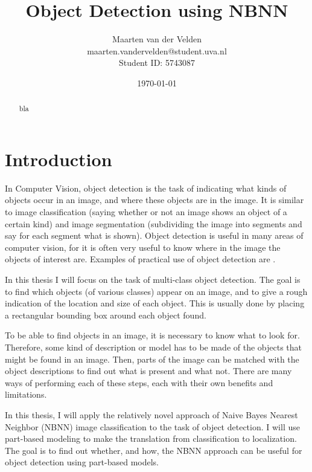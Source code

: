 \documentclass[a4paper,10pt]{article}
\title{Object Detection using NBNN}
\author{Maarten van der Velden\\maarten.vandervelden@student.uva.nl\\Student ID: 5743087}
\date{\today}
\begin{document}
\begin{titlepage}
    \vspace{10cm}
    \maketitle
    \thispagestyle{empty}
\end{titlepage}


\begin{abstract}
    bla
\end{abstract}

\section{Introduction} %
\label{sec:introduction}
In Computer Vision, object detection is the task of indicating what kinds of objects occur in an image, and where these objects are in the image. It is similar to image classification (saying whether or not an image shows an object of a certain kind) and image segmentation (subdividing the image into segments and say for each segment what is shown). Object detection is useful in many areas of computer vision, for it is often very useful to know where in the image the objects of interest are. Examples of practical use of object detection are .

In this thesis I will focus on the task of multi-class object detection. The goal is to find which objects (of various classes) appear on an image, and to give a rough indication of the location and size of each object. This is usually done by placing a rectangular bounding box around each object found. 

To be able to find objects in an image, it is necessary to know what to look for. Therefore, some kind of description or model has to be made of the objects that might be found in an image. Then, parts of the image can be matched with the object descriptions to find out what is present and what not. There are many ways of performing each of these steps, each with their own benefits and limitations.

In this thesis, I will apply the relatively novel approach of Naive Bayes Nearest Neighbor (NBNN) image classification \cite{boiman2008defense}  to the task of object detection. I will use part-based modeling  to make the translation from classification to localization. The goal is to find out whether, and how, the NBNN approach can be useful for object detection using part-based models.
\end{document}
